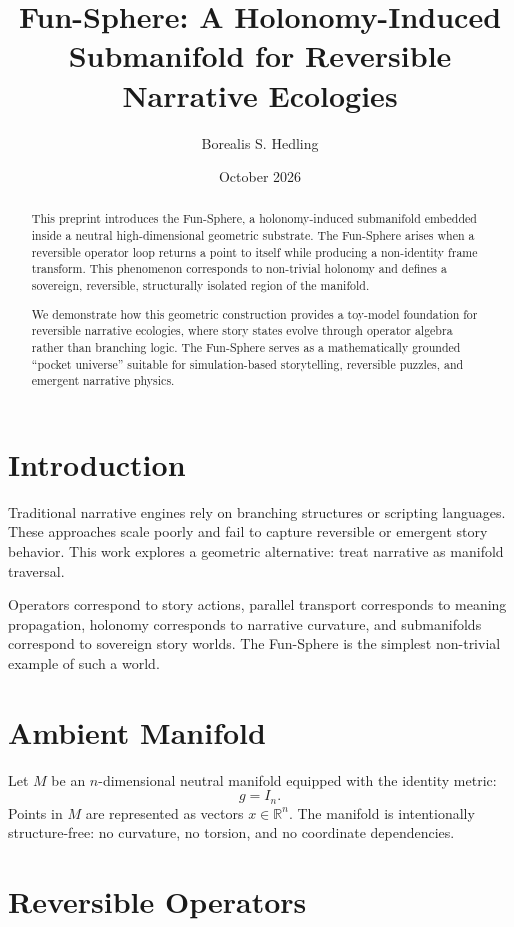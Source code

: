 \documentclass[11pt]{article}
\title{Fun-Sphere: A Holonomy-Induced Submanifold for Reversible Narrative Ecologies}
\author{Borealis S. Hedling}
\date{October 2026}
\begin{document}
\maketitle

\begin{abstract}
This preprint introduces the Fun-Sphere, a holonomy-induced submanifold
embedded inside a neutral high-dimensional geometric substrate. The
Fun-Sphere arises when a reversible operator loop returns a point to
itself while producing a non-identity frame transform. This phenomenon
corresponds to non-trivial holonomy and defines a sovereign, reversible,
structurally isolated region of the manifold.

We demonstrate how this geometric construction provides a toy-model
foundation for reversible narrative ecologies, where story states evolve
through operator algebra rather than branching logic. The Fun-Sphere
serves as a mathematically grounded ``pocket universe'' suitable for
simulation-based storytelling, reversible puzzles, and emergent
narrative physics.
\end{abstract}

\section{Introduction}

Traditional narrative engines rely on branching structures or scripting
languages. These approaches scale poorly and fail to capture reversible
or emergent story behavior. This work explores a geometric alternative:
treat narrative as manifold traversal.

Operators correspond to story actions, parallel transport corresponds to
meaning propagation, holonomy corresponds to narrative curvature, and
submanifolds correspond to sovereign story worlds. The Fun-Sphere is the
simplest non-trivial example of such a world.

\section{Ambient Manifold}

Let $M$ be an $n$-dimensional neutral manifold equipped with the identity
metric:
\[
g = I_n.
\]
Points in $M$ are represented as vectors $x \in \mathbb{R}^n$. The
manifold is intentionally structure-free: no curvature, no torsion, and
no coordinate dependencies.

\section{Reversible Operators}
\end{document}
